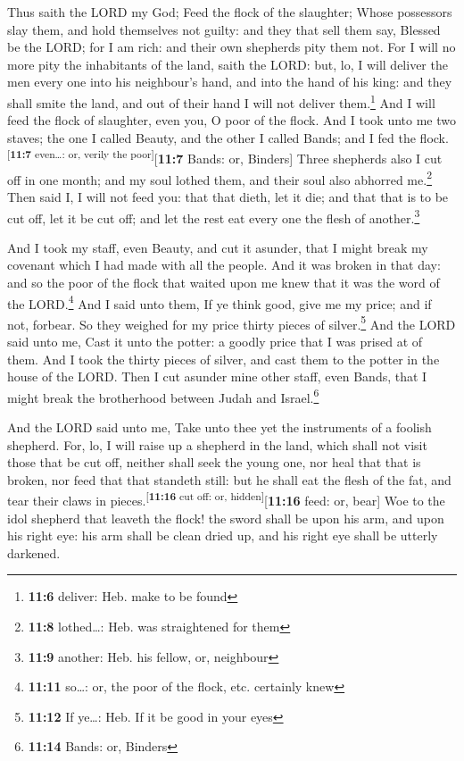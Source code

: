 Thus saith the LORD my God; Feed the flock of the
slaughter;  Whose possessors slay them, and hold
themselves not guilty: and they that sell them say, Blessed be the LORD;
for I am rich: and their own shepherds pity them not.  For
I will no more pity the inhabitants of the land, saith the LORD: but,
lo, I will deliver the men every one into his neighbour's hand, and into
the hand of his king: and they shall smite the land, and out of their
hand I will not deliver them.\footnote{\textbf{11:6} deliver: Heb. make
  to be found}  And I will feed the flock of slaughter,
even you, O poor of the flock. And I took unto me two staves; the one I
called Beauty, and the other I called Bands; and I fed the
flock.\textsuperscript{{[}\textbf{11:7} even\ldots: or, verily the
poor{]}}{[}\textbf{11:7} Bands: or, Binders{]}  Three
shepherds also I cut off in one month; and my soul lothed them, and
their soul also abhorred me.\footnote{\textbf{11:8} lothed\ldots: Heb.
  was straightened for them}  Then said I, I will not feed
you: that that dieth, let it die; and that that is to be cut off, let it
be cut off; and let the rest eat every one the flesh of
another.\footnote{\textbf{11:9} another: Heb. his fellow, or, neighbour}

 And I took my staff, even Beauty, and cut it asunder,
that I might break my covenant which I had made with all the people.
 And it was broken in that day: and so the poor of the
flock that waited upon me knew that it was the word of the
LORD.\footnote{\textbf{11:11} so\ldots: or, the poor of the flock, etc.
  certainly knew}  And I said unto them, If ye think
good, give me my price; and if not, forbear. So they weighed for my
price thirty pieces of silver.\footnote{\textbf{11:12} If ye\ldots: Heb.
  If it be good in your eyes}  And the LORD said unto me,
Cast it unto the potter: a goodly price that I was prised at of them.
And I took the thirty pieces of silver, and cast them to the potter in
the house of the LORD.  Then I cut asunder mine other
staff, even Bands, that I might break the brotherhood between Judah and
Israel.\footnote{\textbf{11:14} Bands: or, Binders}

 And the LORD said unto me, Take unto thee yet the
instruments of a foolish shepherd.  For, lo, I will raise
up a shepherd in the land, which shall not visit those that be cut off,
neither shall seek the young one, nor heal that that is broken, nor feed
that that standeth still: but he shall eat the flesh of the fat, and
tear their claws in pieces.\textsuperscript{{[}\textbf{11:16} cut off:
or, hidden{]}}{[}\textbf{11:16} feed: or, bear{]}  Woe to
the idol shepherd that leaveth the flock! the sword shall be upon his
arm, and upon his right eye: his arm shall be clean dried up, and his
right eye shall be utterly darkened.


